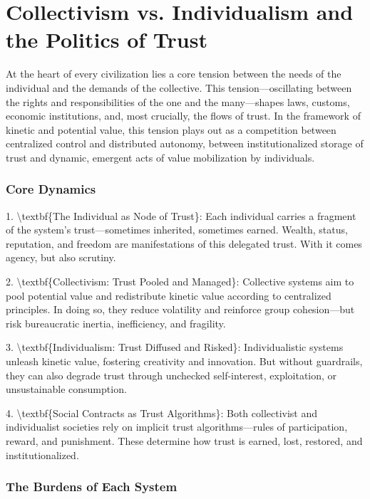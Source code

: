 \documentclass[11pt,oneside]{book}
\begin{document}
\section{Collectivism vs. Individualism and the Politics of Trust}

At the heart of every civilization lies a core tension between the needs of the individual and the demands of the collective. This tension—oscillating between the rights and responsibilities of the one and the many—shapes laws, customs, economic institutions, and, most crucially, the flows of trust. In the framework of kinetic and potential value, this tension plays out as a competition between centralized control and distributed autonomy, between institutionalized storage of trust and dynamic, emergent acts of value mobilization by individuals.

\subsubsection{Core Dynamics}

1. \textbackslash textbf\{The Individual as Node of Trust\}: Each individual carries a fragment of the system's trust—sometimes inherited, sometimes earned. Wealth, status, reputation, and freedom are manifestations of this delegated trust. With it comes agency, but also scrutiny.

2. \textbackslash textbf\{Collectivism: Trust Pooled and Managed\}: Collective systems aim to pool potential value and redistribute kinetic value according to centralized principles. In doing so, they reduce volatility and reinforce group cohesion—but risk bureaucratic inertia, inefficiency, and fragility.

3. \textbackslash textbf\{Individualism: Trust Diffused and Risked\}: Individualistic systems unleash kinetic value, fostering creativity and innovation. But without guardrails, they can also degrade trust through unchecked self-interest, exploitation, or unsustainable consumption.

4. \textbackslash textbf\{Social Contracts as Trust Algorithms\}: Both collectivist and individualist societies rely on implicit trust algorithms—rules of participation, reward, and punishment. These determine how trust is earned, lost, restored, and institutionalized.

\subsubsection{The Burdens of Each System}
\end{document}
